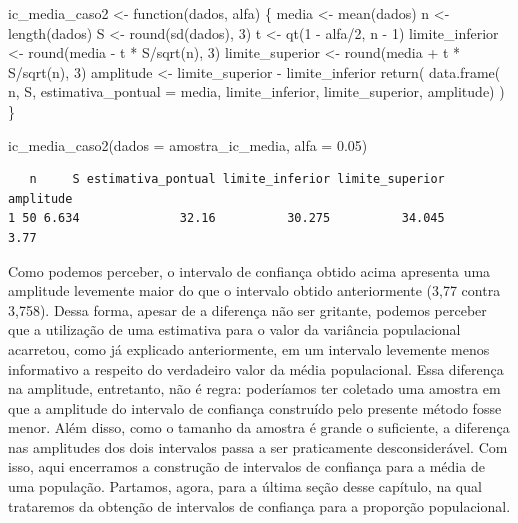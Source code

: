 \documentclass[
  letterpaper,
  DIV=11,
  numbers=noendperiod]{scrreprt}
\newenvironment{Shaded}{\begin{snugshade}}{\end{snugshade}}
\newcommand{\AttributeTok}[1]{\textcolor[rgb]{0.40,0.45,0.13}{#1}}
\newcommand{\ControlFlowTok}[1]{\textcolor[rgb]{0.00,0.23,0.31}{#1}}
\newcommand{\DecValTok}[1]{\textcolor[rgb]{0.68,0.00,0.00}{#1}}
\newcommand{\FloatTok}[1]{\textcolor[rgb]{0.68,0.00,0.00}{#1}}
\newcommand{\FunctionTok}[1]{\textcolor[rgb]{0.28,0.35,0.67}{#1}}
\newcommand{\NormalTok}[1]{\textcolor[rgb]{0.00,0.23,0.31}{#1}}
\newcommand{\OtherTok}[1]{\textcolor[rgb]{0.00,0.23,0.31}{#1}}
\newcommand{\SpecialCharTok}[1]{\textcolor[rgb]{0.37,0.37,0.37}{#1}}
\begin{document}
\begin{Shaded}
\begin{Highlighting}[]
\NormalTok{ic\_media\_caso2 }\OtherTok{\textless{}{-}} \ControlFlowTok{function}\NormalTok{(dados, alfa) \{}
\NormalTok{  media }\OtherTok{\textless{}{-}} \FunctionTok{mean}\NormalTok{(dados)}
\NormalTok{  n }\OtherTok{\textless{}{-}} \FunctionTok{length}\NormalTok{(dados)}
\NormalTok{  S }\OtherTok{\textless{}{-}} \FunctionTok{round}\NormalTok{(}\FunctionTok{sd}\NormalTok{(dados), }\DecValTok{3}\NormalTok{)}
\NormalTok{  t }\OtherTok{\textless{}{-}} \FunctionTok{qt}\NormalTok{(}\DecValTok{1} \SpecialCharTok{{-}}\NormalTok{ alfa}\SpecialCharTok{/}\DecValTok{2}\NormalTok{, n }\SpecialCharTok{{-}} \DecValTok{1}\NormalTok{)}
\NormalTok{  limite\_inferior }\OtherTok{\textless{}{-}} \FunctionTok{round}\NormalTok{(media }\SpecialCharTok{{-}}\NormalTok{ t }\SpecialCharTok{*}\NormalTok{ S}\SpecialCharTok{/}\FunctionTok{sqrt}\NormalTok{(n), }\DecValTok{3}\NormalTok{)}
\NormalTok{  limite\_superior }\OtherTok{\textless{}{-}} \FunctionTok{round}\NormalTok{(media }\SpecialCharTok{+}\NormalTok{ t }\SpecialCharTok{*}\NormalTok{ S}\SpecialCharTok{/}\FunctionTok{sqrt}\NormalTok{(n), }\DecValTok{3}\NormalTok{)}
\NormalTok{  amplitude }\OtherTok{\textless{}{-}}\NormalTok{ limite\_superior }\SpecialCharTok{{-}}\NormalTok{ limite\_inferior}
  \FunctionTok{return}\NormalTok{(}
    \FunctionTok{data.frame}\NormalTok{(}
\NormalTok{      n,}
\NormalTok{      S, }
      \AttributeTok{estimativa\_pontual =}\NormalTok{ media,}
\NormalTok{      limite\_inferior,}
\NormalTok{      limite\_superior,}
\NormalTok{      amplitude)}
\NormalTok{    )}
\NormalTok{\}}

\FunctionTok{ic\_media\_caso2}\NormalTok{(}\AttributeTok{dados =}\NormalTok{ amostra\_ic\_media, }\AttributeTok{alfa =} \FloatTok{0.05}\NormalTok{)}
\end{Highlighting}
\end{Shaded}

\begin{verbatim}
   n     S estimativa_pontual limite_inferior limite_superior amplitude
1 50 6.634              32.16          30.275          34.045      3.77
\end{verbatim}

Como podemos perceber, o intervalo de confiança obtido acima apresenta
uma amplitude levemente maior do que o intervalo obtido anteriormente
(3,77 contra 3,758). Dessa forma, apesar de a diferença não ser
gritante, podemos perceber que a utilização de uma estimativa para o
valor da variância populacional acarretou, como já explicado
anteriormente, em um intervalo levemente menos informativo a respeito do
verdadeiro valor da média populacional. Essa diferença na amplitude,
entretanto, não é regra: poderíamos ter coletado uma amostra em que a
amplitude do intervalo de confiança construído pelo presente método
fosse menor. Além disso, como o tamanho da amostra é grande o
suficiente, a diferença nas amplitudes dos dois intervalos passa a ser
praticamente desconsiderável. Com isso, aqui encerramos a construção de
intervalos de confiança para a média de uma população. Partamos, agora,
para a última seção desse capítulo, na qual trataremos da obtenção de
intervalos de confiança para a proporção populacional.
\end{document}
